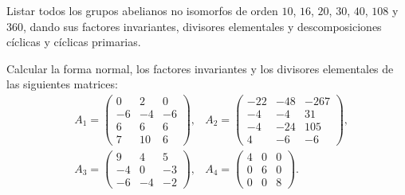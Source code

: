 \begin{ejercicio}\label{ej:7.6}
    Listar todos los grupos abelianos no isomorfos de orden $10$, $16$, $20$, $30$, $40$, $108$ y $360$, dando sus factores invariantes, divisores elementales y descomposiciones cíclicas y cíclicas primarias.
\end{ejercicio}

\begin{ejercicio}\label{ej:7.7}
    Calcular la forma normal, los factores invariantes y los divisores elementales de las siguientes matrices:
    \begin{align*}
        &A_1 = \begin{pmatrix}
            0 & 2 & 0 \\
            -6 & -4 & -6 \\
            6 & 6 & 6 \\
            7 & 10 & 6
        \end{pmatrix},
        &A_2 = \begin{pmatrix}
            -22 & -48 & -267 \\
            -4 & -4 & 31 \\
            -4 & -24 & 105 \\
            4 & -6 & -6
        \end{pmatrix},\\
        &A_3 = \begin{pmatrix}
            9 & 4 & 5 \\
            -4 & 0 & -3 \\
            -6 & -4 & -2
        \end{pmatrix},
        &A_4 = \begin{pmatrix}
            4 & 0 & 0 \\
            0 & 6 & 0 \\
            0 & 0 & 8
        \end{pmatrix}.
    \end{align*}
\end{ejercicio}

